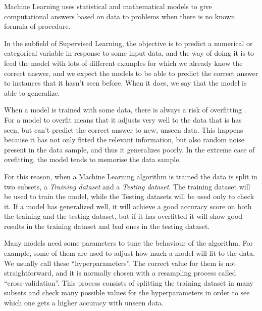 \begin{pre-delivery}

  Machine Learning uses statistical and mathematical models to give
  computational answers based on data to problems when there is no known
  formula of procedure.

  In the subfield of Supervised Learning, the objective is to predict a numerical
  or categorical variable in response to some input data, and the way of doing
  it is to feed the model with lots of different examples for which we already
  know the correct answer, and we expect the models to be able to predict
  the correct answer to instances that it hasn't seen before. When it does,
  we say that the model is able to generalize.

  When a model is trained with some data, there is always a risk of overfitting
  \cite{hawkins2004problem}.
  For a model to overfit means that it adjusts very well to the data that is
  has seen, but can't predict the correct answer to new, unseen data.
  This happens because it has not only fitted the relevant information,
  but also random noise present in the data sample, and thus it generalizes
  poorly. In the extreme case of ovefitting, the model tends to memorise the
  data sample.

  For this reason, when a Machine Learning algorithm is trained the data
  is split in two subsets, a \textit{Training  dataset} and a \textit{Testing
  dataset}. The training dataset will be used to train the model, while the
  Testing datasets will be used only to check it. If a model has generalized
  well, it will achieve a good accuracy score on both the training and the
  testing dataset, but if it has overfitted it will show good results in the
  training dataset and bad ones in the testing dataset.

  Many models need some parameters to tune the behaviour of the algorithm. For
  example, some of them are used to adjust how much a model will fit to the data.
  We usually call these ``hyperparameters''. The correct value for them is not
  straightforward, and it is normally chosen with a resampling process called
  ``cross-validation''\cite{geisser2017predictive}. This process consists of
  splitting the training dataset
  in many subsets and check many possible values for the hyperparameters in order
  to see which one gets a higher accuracy with unseen data.
\end{pre-delivery}

